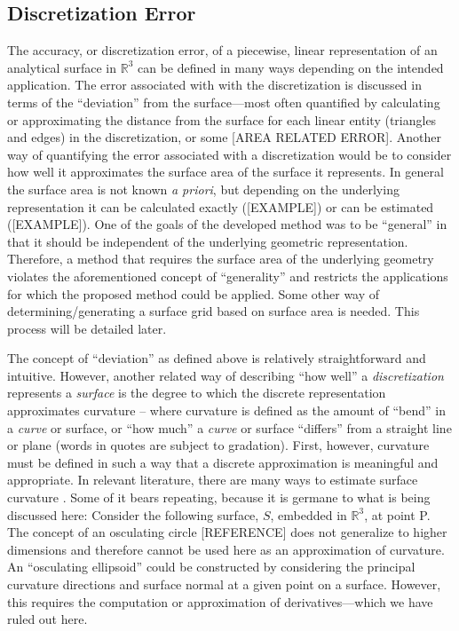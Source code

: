 \subsection{Discretization Error}
The accuracy, or discretization error, of a piecewise, linear
representation of an analytical surface in ${\mathbb R}^3$ can be
defined in many ways depending on the intended application. The error
associated with with the discretization is discussed in terms of the
``deviation'' from the surface---most often quantified by calculating or
approximating the distance from the surface for each linear entity
(triangles and edges) in the discretization, or some [AREA RELATED
ERROR]. Another way of quantifying the error associated with a
discretization would be to consider how well it approximates the surface
area of the surface it represents. In general the surface area is not
known {\it a priori}, but depending on the underlying representation it
can be calculated exactly ([EXAMPLE]) or can be estimated ([EXAMPLE]).
One of the goals of the developed method was to be ``general'' in that
it should be independent of the underlying geometric representation.
Therefore, a method that requires the surface area of the underlying
geometry violates the aforementioned concept of ``generality'' and
restricts the applications for which the proposed method could be
applied. Some other way of determining/generating a surface grid based
on surface area is needed. This process will be detailed later.

The concept of ``deviation'' as defined above is relatively
straightforward and intuitive. However, another related way of
describing ``how well'' a \textit{discretization} represents a
\textit{surface} is the degree to which the discrete representation
approximates curvature -- where curvature is defined as the amount of
``bend'' in a \textit{curve} or surface, or ``how much'' a
\textit{curve} or surface ``differs'' from a straight line or plane
(words in quotes are subject to gradation). First, however, curvature
must be defined in such a way that a discrete approximation is
meaningful and appropriate. In relevant literature, there are many ways
to estimate surface curvature \cite{hermann07}. Some of it bears
repeating, because it is germane to what is being discussed here:
Consider the following surface, $S$, embedded in ${\mathbb R}^3$, at
point P. The concept of an osculating circle [REFERENCE] does not
generalize to higher dimensions and therefore cannot be used here as an
approximation of curvature. An ``osculating ellipsoid'' could be
constructed by considering the principal curvature directions and
surface normal at a given point on a surface. However, this requires the
computation or approximation of derivatives---which we have ruled out
here.

